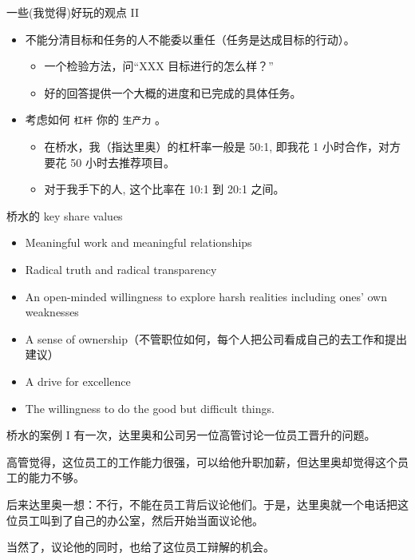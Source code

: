 \documentclass[presentation, bigger]{beamer}
\begin{document}
\begin{frame}[fragile,label={sec:org78acc11}]{一些(我觉得)好玩的观点 II}
 \begin{itemize}
\item 不能分清目标和任务的人不能委以重任（任务是达成目标的行动）。
\begin{itemize}
\item 一个检验方法，问“XXX 目标进行的怎么样？”
\item 好的回答提供一个大概的进度和已完成的具体任务。
\end{itemize}
\item 考虑如何 \texttt{杠杆} 你的 \texttt{生产力} 。
\begin{itemize}
\item 在桥水，我（指达里奥）的杠杆率一般是 50:1, 即我花 1 小时合作，对方要花 50 小时去推荐项目。
\item 对于我手下的人, 这个比率在 10:1 到 20:1 之间。
\end{itemize}
\end{itemize}
\end{frame}

\begin{frame}[label={sec:orgef61f43}]{桥水的 key share values}
\begin{itemize}
\item Meaningful work and meaningful relationships
\item Radical truth and radical transparency
\item An open-minded willingness to explore harsh realities including ones' own weaknesses
\item A sense of ownership（不管职位如何，每个人把公司看成自己的去工作和提出建议）
\item A drive for excellence
\item The willingness to do the good but difficult things.
\end{itemize}
\end{frame}

\begin{frame}[label={sec:orga37b0c3}]{桥水的案例 I}
有一次，达里奥和公司另一位高管讨论一位员工晋升的问题。

高管觉得，这位员工的工作能力很强，可以给他升职加薪，但达里奥却觉得这个员工的能力不够。

后来达里奥一想：不行，不能在员工背后议论他们。于是，达里奥就一个电话把这位员工叫到了自己的办公室，然后开始当面议论他。

当然了，议论他的同时，也给了这位员工辩解的机会。
\end{frame}
\end{document}
